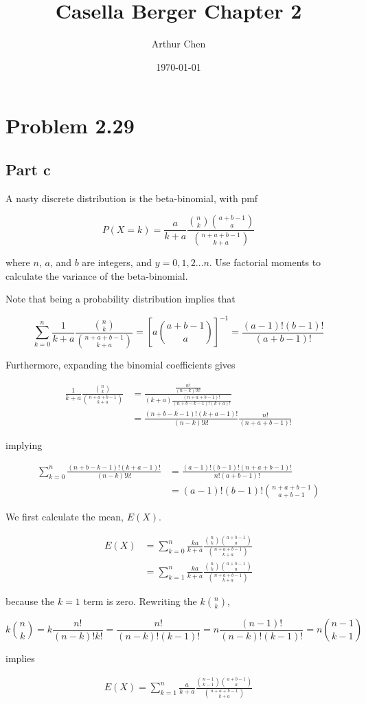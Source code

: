 \documentclass{article}
\author{Arthur Chen}
\title{Casella Berger Chapter 2}
\date{\today}
\begin{document}
\maketitle

\section*{Problem 2.29}

\subsection*{Part c}

A nasty discrete distribution is the beta-binomial, with pmf

\[
P(X=k) = \frac{a}{k+a}
\frac{{n \choose k} {a+b-1 \choose a}}
{{n+a+b-1 \choose k+a}}
\]

where $n$, $a$, and $b$ are integers, and $y = 0, 1, 2 \dots n$. Use factorial moments to calculate the variance of the beta-binomial.

Note that being a probability distribution implies that

\[
\sum_{k=0}^n \frac{1}{k+a}
\frac{{n \choose k}}{{n+a+b-1 \choose k+a}}
=
[a {a+b-1 \choose a}]^{-1}
=
\frac{(a-1)!(b-1)!}{(a+b-1)!}
\]

Furthermore, expanding the binomial coefficients gives

\begin{align*}
\frac{1}{k+a}
\frac{{n \choose k}}{{n+a+b-1 \choose k+a}}
&=
\frac{\frac{n!}{(n-k)!k!}}
{
(k+a)
\frac{(n+a+b-1)!}{(n+b-k-1)!(k+a)!}
} \\
&=
\frac{(n+b-k-1)!(k+a-1)!}{(n-k)!k!}
\frac{n!}{(n+a+b-1)!}
\end{align*}

implying

\begin{align}
\sum_{k=0}^n \frac{(n+b-k-1)!(k+a-1)!}{(n-k)!k!}
&=\frac{(a-1)!(b-1)!(n+a+b-1)!}{n!(a+b-1)!} \\
&=(a-1)!(b-1)!{n+a+b-1 \choose a+b-1}
\end{align}

We first calculate the mean, $E(X)$.

\begin{align*}
E(X) &=
\sum_{k=0}^n
\frac{ka}{k+a}
\frac{{n \choose k} {a+b-1 \choose a}}
{{n+a+b-1 \choose k+a}} \\
&= \sum_{k=1}^n
\frac{ka}{k+a}
\frac{{n \choose k} {a+b-1 \choose a}}
{{n+a+b-1 \choose k+a}}
\end{align*}

because the $k=1$ term is zero. Rewriting the $k{n \choose k}$,

\[
k{n \choose k} = k \frac{n!}{(n-k)!k!} = \frac{n!}{(n-k)!(k-1)!} = n\frac{(n-1)!}{(n-k)!(k-1)!} = n {n-1 \choose k-1}
\]

implies

\begin{align*}
E(X) = \sum_{k=1}^n
\frac{a}{k+a}
\frac{{n-1 \choose k-1} {a+b-1 \choose a}}
{{n+a+b-1 \choose k+a}}
\end{align*}
\end{document}
